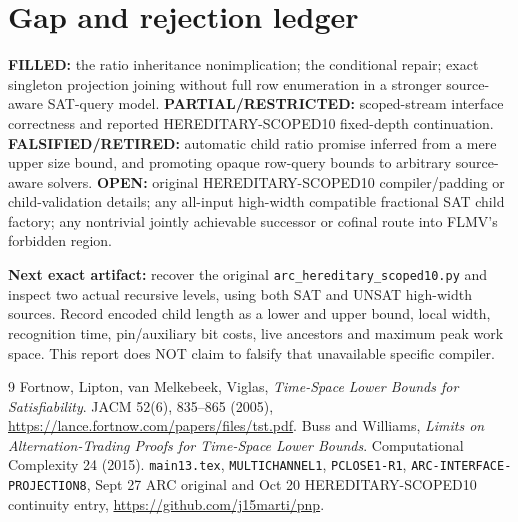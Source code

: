 \documentclass[11pt]{article}
\begin{document}
\section{Gap and rejection ledger}
\noindent \textbf{FILLED:} the ratio inheritance nonimplication; the conditional repair; exact singleton projection joining without full row enumeration in a stronger source-aware SAT-query model. \textbf{PARTIAL/RESTRICTED:} scoped-stream interface correctness and reported HEREDITARY-SCOPED10 fixed-depth continuation. \textbf{FALSIFIED/RETIRED:} automatic child ratio promise inferred from a mere upper size bound, and promoting opaque row-query bounds to arbitrary source-aware solvers. \textbf{OPEN:} original HEREDITARY-SCOPED10 compiler/padding or child-validation details; any all-input high-width compatible fractional SAT child factory; any nontrivial jointly achievable successor or cofinal route into FLMV's forbidden region.
\par\noindent \textbf{Next exact artifact:} recover the original \texttt{arc\_hereditary\_scoped10.py} and inspect two actual recursive levels, using both SAT and UNSAT high-width sources. Record encoded child length as a lower and upper bound, local width, recognition time, pin/auxiliary bit costs, live ancestors and maximum peak work space. This report does NOT claim to falsify that unavailable specific compiler.
\begin{thebibliography}{9}
 Fortnow, Lipton, van Melkebeek, Viglas, \emph{Time-Space Lower Bounds for Satisfiability}. JACM 52(6), 835--865 (2005), \url{https://lance.fortnow.com/papers/files/tst.pdf}.
 Buss and Williams, \emph{Limits on Alternation-Trading Proofs for Time-Space Lower Bounds}. Computational Complexity 24 (2015).
 \texttt{main13.tex}, \texttt{MULTICHANNEL1}, \texttt{PCLOSE1-R1}, \texttt{ARC-INTERFACE-PROJECTION8}, Sept 27 ARC original and Oct 20 HEREDITARY-SCOPED10 continuity entry, \url{https://github.com/j15marti/pnp}.
\end{thebibliography}
\end{document}
